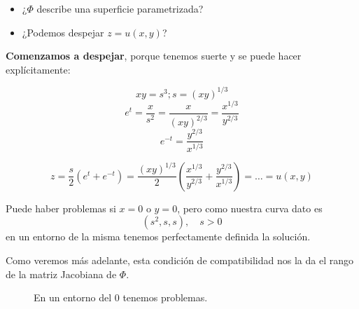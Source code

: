 \begin{example}
		\begin{itemize}[itemsep = 1pt]
			\item ¿$\Phi$ describe una superficie parametrizada?
			\item ¿Podemos despejar $z=u(x,y)$?
		\end{itemize}

		\textbf{Comenzamos a despejar}, porque tenemos suerte y se puede hacer explícitamente:

		$$xy = s^3; s=(xy)^{1/3}$$
		$$e^t = \frac{x}{s^2} = \frac{x}{(xy)^{2/3}} = \frac{x^{1/3}}{y^{2/3}}$$
		$$e^{-t} = \frac{y^{2/3}}{x^{1/3}}$$

		$$z = \frac{s}{2}(e^{t}+e^{-t}) = \frac{(xy)^{1/3}}{2} (\frac{x^{1/3}}{y^{2/3}}+\frac{y^{2/3}}{x^{1/3}}) = … = u(x,y) $$


		Puede haber problemas si $x=0$ o $y=0$, pero como nuestra curva dato es
		$$(s^2,s,s), \quad s > 0$$
		en un entorno de la misma tenemos perfectamente definida la solución.

		Como veremos más adelante, esta condición de compatibilidad nos la da el rango de la matriz Jacobiana de $\Phi$.

		\begin{figure}[hbtp]
			\centering
			\caption{En un entorno del 0 tenemos problemas.}
			\label{fig:curva-dato-ProblemaCauchy}
		\end{figure}

	\end{example}

